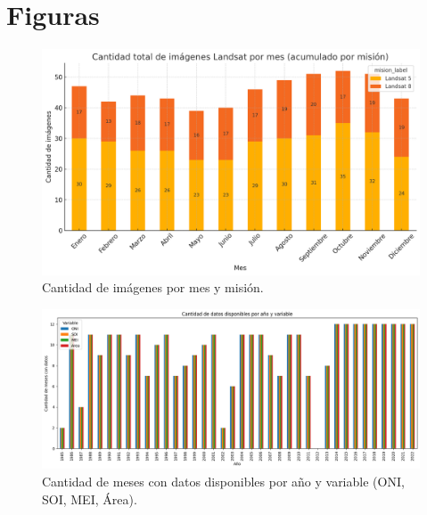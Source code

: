 
\chapter{Figuras} %

\label{AppendixA} %


\begin{figure}[ht]
        \centering
        \includegraphics[scale=.4]
        {Figures/fig12.png}
        \caption{Cantidad de imágenes por mes y misión.}
        \label{fig:cant_imagenes}
\end{figure}

\begin{figure}[htpb]
    \centering
    \includegraphics[scale=.40]{Figures/conteo_series.png}
    \caption{Cantidad de meses con datos disponibles por año y variable (ONI, SOI, MEI, Área).}
    \label{fig:conteo_datos}
\end{figure}

